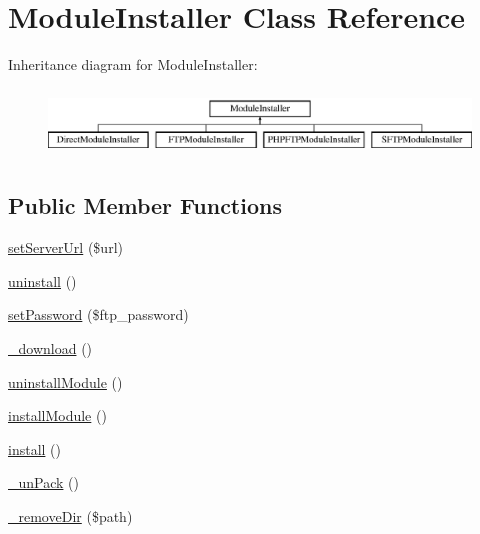 \hypertarget{classModuleInstaller}{\section{Module\+Installer Class Reference}
\label{classModuleInstaller}
}
Inheritance diagram for Module\+Installer\+:\begin{figure}[H]
\begin{center}
\leavevmode
\includegraphics[height=1.818182cm]{classModuleInstaller}
\end{center}
\end{figure}
\subsection*{Public Member Functions}
\begin{DoxyCompactItemize}
\item 
\hyperlink{classModuleInstaller_a4b4f25bccb1203ee61ff75dd1a0e0964}{set\+Server\+Url} (\$url)
\item 
\hyperlink{classModuleInstaller_a641ebe46305e7c320eec21a13d7e029f}{uninstall} ()
\item 
\hyperlink{classModuleInstaller_ad0cad9e399cc3a7de3f742d43364e96a}{set\+Password} (\$ftp\+\_\+password)
\item 
\hyperlink{classModuleInstaller_aeaa5ff80b85cbf6718f19e755fcbc016}{\+\_\+download} ()
\item 
\hyperlink{classModuleInstaller_a9ab463e12e9685dc42d4223b86a92754}{uninstall\+Module} ()
\item 
\hyperlink{classModuleInstaller_a07eb4b03dfd704124e05142cef5c9e82}{install\+Module} ()
\item 
\hyperlink{classModuleInstaller_aada761e2e31fc610bb69680991813bf8}{install} ()
\item 
\hyperlink{classModuleInstaller_a4b669f44350c27a508c2aac3180836f6}{\+\_\+un\+Pack} ()
\item 
\hyperlink{classModuleInstaller_a1d67a0ab016c393b15df54dabff74e9b}{\+\_\+remove\+Dir} (\$path)
\end{DoxyCompactItemize}
